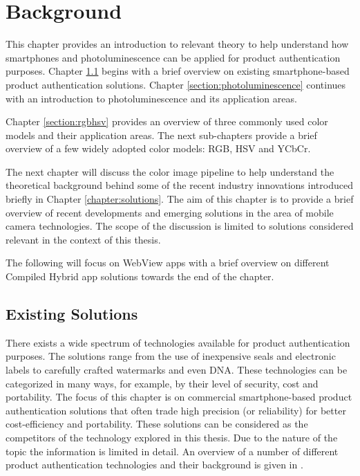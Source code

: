 \documentclass[thesis.tex]{subfiles}
\begin{document}
\chapter{Background}
\label{chapter:background}

This chapter provides an introduction to relevant theory to help understand how smartphones and photoluminescence can be applied for product authentication purposes. Chapter \ref{section:existing_solutions} begins with a brief overview on existing smartphone-based product authentication solutions. Chapter \ref{section:photoluminescence} continues with an introduction to photoluminescence and its application areas.

Chapter \ref{section:rgbhsv} provides an overview of three commonly used color models and their application areas.
The next sub-chapters provide a brief overview of a few widely adopted color models: RGB, HSV and YCbCr.


The next chapter will discuss the color image pipeline to help understand the theoretical background behind some of the recent industry innovations introduced briefly in Chapter \ref{chapter:solutions}. The aim of this chapter is to provide a brief overview of recent developments and emerging solutions in the area of mobile camera technologies. The scope of the discussion is limited to solutions considered relevant in the context of this thesis.

The following will focus on WebView apps with a brief overview on different Compiled Hybrid app solutions towards the end of the chapter.



\clearpage

\section{Existing Solutions}
\label{section:existing_solutions}

There exists a wide spectrum of technologies available for product authentication purposes. The solutions range from the use of inexpensive seals and electronic labels to carefully crafted watermarks and even DNA. These technologies can be categorized in many ways, for example, by their level of security, cost and portability. The focus of this chapter is on commercial smartphone-based product authentication solutions that often trade high precision (or reliability) for better cost-efficiency and portability. These solutions can be considered as the competitors of the technology explored in this thesis. Due to the nature of the topic the information is limited in detail. An overview of a number of different product authentication technologies and their background is given in \cite{kuosmanen}.
\end{document}
